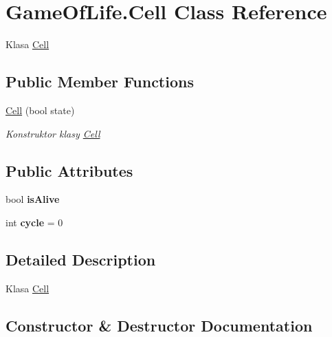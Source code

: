 \hypertarget{class_game_of_life_1_1_cell}{}\section{Game\+Of\+Life.\+Cell Class Reference}
\label{class_game_of_life_1_1_cell}


Klasa \mbox{\hyperlink{class_game_of_life_1_1_cell}{Cell}}  


\subsection*{Public Member Functions}
\begin{DoxyCompactItemize}
\item 
\mbox{\hyperlink{class_game_of_life_1_1_cell_acee43c82c5d6199aed619bcb5ff058a2}{Cell}} (bool state)
\begin{DoxyCompactList}\small\item\em Konstruktor klasy \mbox{\hyperlink{class_game_of_life_1_1_cell}{Cell}} \end{DoxyCompactList}\end{DoxyCompactItemize}
\subsection*{Public Attributes}
\begin{DoxyCompactItemize}
\item 
\mbox{\label{class_game_of_life_1_1_cell_a2342885e93a32354977972a0733ff4fb}} 
bool {\bfseries is\+Alive}
\item 
\mbox{\label{class_game_of_life_1_1_cell_aefa51e19294aa11c4069a7e767f08780}} 
int {\bfseries cycle} = 0
\end{DoxyCompactItemize}


\subsection{Detailed Description}
Klasa \mbox{\hyperlink{class_game_of_life_1_1_cell}{Cell}} 



\subsection{Constructor \& Destructor Documentation}
\mbox{\label{class_game_of_life_1_1_cell_acee43c82c5d6199aed619bcb5ff058a2}} 
